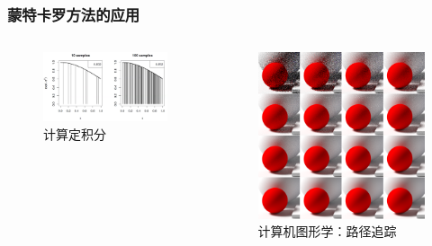 \documentclass{beamer}
\begin{document}
\begin{frame}
    \frametitle{蒙特卡罗方法的应用}

    \begin{columns}
        
        \begin{figure}
            \centering
            \includegraphics[width=.98\textwidth]{res/integral.png}
            \caption{计算定积分}
        \end{figure}

        
        \begin{figure}
            \centering
            \includegraphics[width=.98\textwidth]{res/path_tracing_sampling.png}
            \caption{计算机图形学：路径追踪}
        \end{figure}
    \end{columns}
    
\end{frame}
\end{document}
